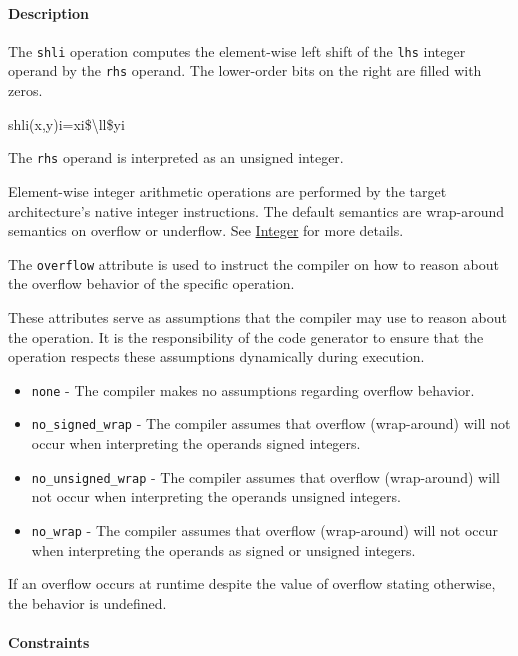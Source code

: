 \documentclass{article}
\begin{document}
\begin{itemize}
\paragraph{Description}

\end{itemize}
The \texttt{shli} operation computes the element-wise left shift of the \texttt{lhs} integer operand by the \texttt{rhs} operand. The lower-order bits on the right are filled with zeros.


shli(x,y)i=xi\$\textbackslash{}ll\$yi

The \texttt{rhs} operand is interpreted as an unsigned integer.


Element-wise integer arithmetic operations are performed by the target architecture's native integer instructions. The default semantics are wrap-around semantics on overflow or underflow. See \href{https://docs.nvidia.com/cuda/tile-ir/latest/sections/operations.html#op-group-integer}{Integer} for more details.


The \texttt{overflow} attribute is used to instruct the compiler on how to reason about the overflow behavior of the specific operation.


These attributes serve as assumptions that the compiler may use to reason about the operation. It is the responsibility of the code generator to ensure that the operation respects these assumptions dynamically during execution.


\begin{itemize}
\item \texttt{none} - The compiler makes no assumptions regarding overflow behavior.
\item \texttt{no\_signed\_wrap} - The compiler assumes that overflow (wrap-around) will not occur when interpreting the operands signed integers.
\item \texttt{no\_unsigned\_wrap} - The compiler assumes that overflow (wrap-around) will not occur when interpreting the operands unsigned integers.
\item \texttt{no\_wrap} - The compiler assumes that overflow (wrap-around) will not occur when interpreting the operands as signed or unsigned integers.

\end{itemize}
If an overflow occurs at runtime despite the value of overflow stating otherwise, the behavior is undefined.



\paragraph{Constraints}
\end{document}
